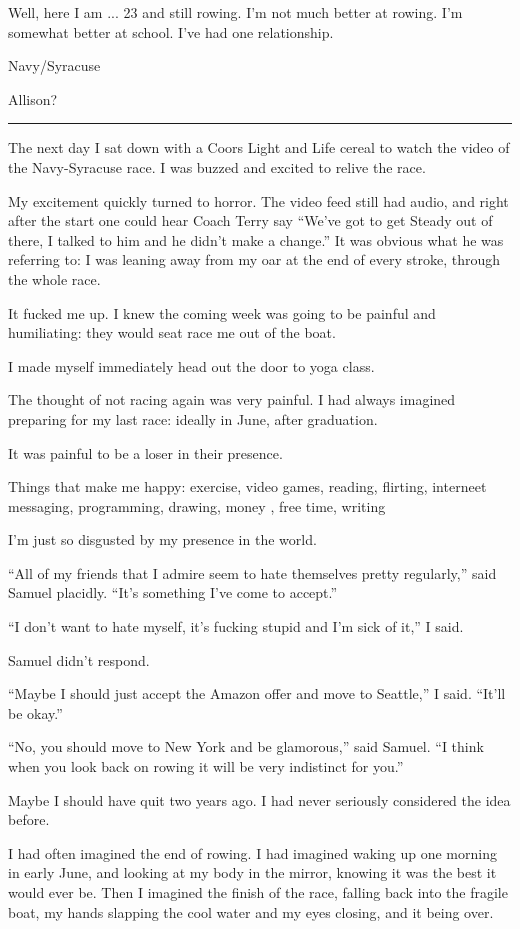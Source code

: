 Well, here I am ... 23 and still rowing.  I'm not much better at rowing.  I'm
somewhat better at school.  I've had one relationship.

Navy/Syracuse

Allison?


\plainfancybreak{12pt}{2}{* * *}

The next day I sat down with a Coors Light and Life cereal to watch the video of
the Navy-Syracuse race.  I was buzzed and excited to relive the race. 

My excitement quickly turned to horror.  The video feed still had audio, and
right after the start one could hear Coach Terry say ``We've got to get Steady
out of there, I talked to him and he didn't make a change.''  It was obvious
what he was referring to: I was leaning away from my oar at the end of every
stroke, through the whole race.

It fucked me up.  I knew the coming week was going to be painful and
humiliating: they would seat race me out of the boat.

I made myself immediately head out the door to yoga class.  

The thought of not racing again was very painful.  I had always imagined
preparing for my last race: ideally in June, after graduation.

It was painful to be a loser in their presence.  

Things that make me happy: exercise, video games, reading, flirting, interneet
messaging, programming, drawing, money , free time, writing

I'm just so disgusted by my presence in the world.

``All of my friends that I admire seem to hate themselves pretty regularly,''
said Samuel placidly.  ``It's something I've come to accept.''

``I don't want to hate myself, it's fucking stupid and I'm sick of it,'' I said.  

Samuel didn't respond.

``Maybe I should just accept the Amazon offer and move to Seattle,'' I said.
``It'll be okay.''

``No, you should move to New York and be glamorous,'' said Samuel.  ``I think
when you look back on rowing it will be very indistinct for you.'' 

Maybe I should have quit two years ago.  I had never seriously considered the
idea before.

I had often imagined the end of rowing.  I had imagined waking up one morning in
early June, and looking at my body in the mirror, knowing it was the best it
would ever be.  Then I imagined  the finish of the race, falling back into the
fragile boat, my hands slapping the cool water and my eyes closing, and it being
over.

